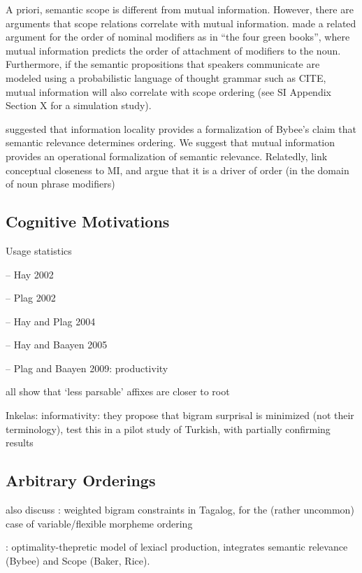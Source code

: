 \documentclass[11pt,letterpaper]{article}
\newcommand{\citep}{\parencite}
\newcommand{\citet}{\Textcite}
\begin{document}
A priori, semantic scope is different from mutual information.
However, there are arguments that scope relations correlate with mutual information.
\citet{culbertson2020from} made a related argument for the order of nominal modifiers as in ``the four green books'', where mutual information predicts the order of attachment of modifiers to the noun.
Furthermore, if the semantic propositions that speakers communicate are modeled using a probabilistic language of thought grammar such as CITE, mutual information will also correlate with scope ordering (see SI Appendix Section X for a simulation study).


\cite{Hahn2020modeling} suggested that information locality provides a formalization of Bybee's \citep{bybee-morphology-1985} claim that semantic relevance determines ordering.
We suggest that mutual information provides an operational formalization of semantic relevance.
Relatedly, \citep{culbertson2020from} link conceptual closeness to MI, and argue that it is a driver of order (in the domain of noun phrase modifiers)

\subsection{Cognitive Motivations}


Usage statistics

-- Hay 2002

-- Plag 2002

-- Hay and Plag 2004

-- Hay and Baayen 2005

-- Plag and Baayen 2009: productivity

all show that `less parsable' affixes are closer to root



Inkelas: informativity: they propose that bigram surprisal is minimized (not their terminology), test this in a pilot study of Turkish, with partially confirming results \citep{inkelas2015informativity}


\subsection{Arbitrary Orderings}

also discuss \cite{ryan2010variable}: weighted bigram constraints in Tagalog, for the (rather uncommon) case of variable/flexible morpheme ordering

\cite{inkelas2016affix}: optimality-thepretic model of lexiacl production, integrates semantic relevance (Bybee) and Scope (Baker, Rice).
\end{document}
